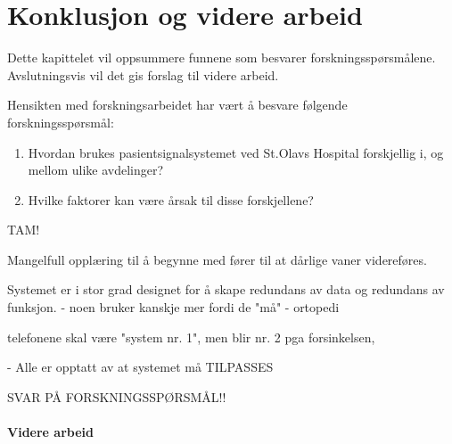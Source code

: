 \chapter{Konklusjon og videre arbeid}
\label{chp:konklusjon} 
Dette kapittelet vil oppsummere funnene som besvarer forskningsspørsmålene. Avslutningsvis vil det gis forslag til videre arbeid.


\noindent
Hensikten med forskningsarbeidet har vært å besvare følgende forskningsspørsmål:

\begin{enumerate}
\item Hvordan brukes pasientsignalsystemet ved St.Olavs Hospital forskjellig i, og mellom ulike avdelinger? 
\item Hvilke faktorer kan være årsak til disse forskjellene?
\end{enumerate}






TAM!

Mangelfull opplæring til å begynne med fører til at dårlige vaner videreføres.

Systemet er i stor grad designet for å skape redundans av data og redundans av funksjon.
- noen bruker kanskje mer fordi de "må" - ortopedi	

telefonene skal være "system nr. 1", men blir nr. 2 pga forsinkelsen,

- Alle er opptatt av at systemet må TILPASSES

SVAR PÅ FORSKNINGSSPØRSMÅL!!

\subsubsection{Videre arbeid}